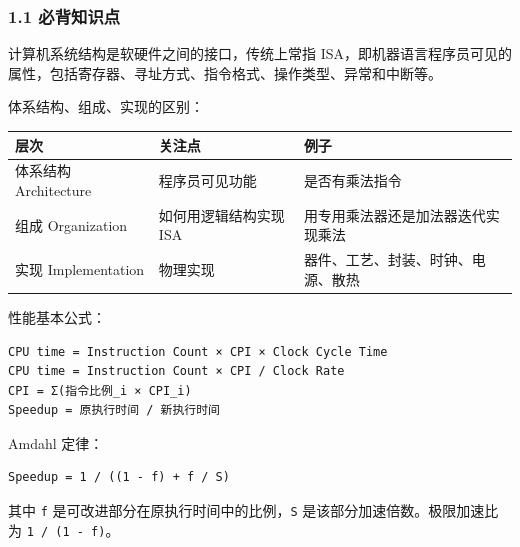 \documentclass[
]{ctexart}
\newcommand{\passthrough}[1]{#1}
\newcounter{none} %
\begin{document}
\subsubsection{1.1 必背知识点}\label{ux5fc5ux80ccux77e5ux8bc6ux70b9}

计算机系统结构是软硬件之间的接口，传统上常指
ISA，即机器语言程序员可见的属性，包括寄存器、寻址方式、指令格式、操作类型、异常和中断等。

体系结构、组成、实现的区别：

{\def\LTcaptype{none} %
\begin{longtable}[]{@{}
  >{\raggedright\arraybackslash}p{}
  >{\raggedright\arraybackslash}p{}
  >{\raggedright\arraybackslash}p{}@{}}
\toprule\noalign{}
\begin{minipage}[b]{\linewidth}\raggedright
层次
\end{minipage} & \begin{minipage}[b]{\linewidth}\raggedright
关注点
\end{minipage} & \begin{minipage}[b]{\linewidth}\raggedright
例子
\end{minipage} \\
\midrule\noalign{}
\endhead
\bottomrule\noalign{}
\endlastfoot
体系结构 Architecture & 程序员可见功能 & 是否有乘法指令 \\
组成 Organization & 如何用逻辑结构实现 ISA &
用专用乘法器还是加法器迭代实现乘法 \\
实现 Implementation & 物理实现 & 器件、工艺、封装、时钟、电源、散热 \\
\end{longtable}
}

性能基本公式：

\begin{lstlisting}
CPU time = Instruction Count × CPI × Clock Cycle Time
CPU time = Instruction Count × CPI / Clock Rate
CPI = Σ(指令比例_i × CPI_i)
Speedup = 原执行时间 / 新执行时间
\end{lstlisting}

Amdahl 定律：

\begin{lstlisting}
Speedup = 1 / ((1 - f) + f / S)
\end{lstlisting}

其中 \passthrough{\lstinline!f!}
是可改进部分在原执行时间中的比例，\passthrough{\lstinline!S!}
是该部分加速倍数。极限加速比为 \passthrough{\lstinline!1 / (1 - f)!}。
\end{document}
